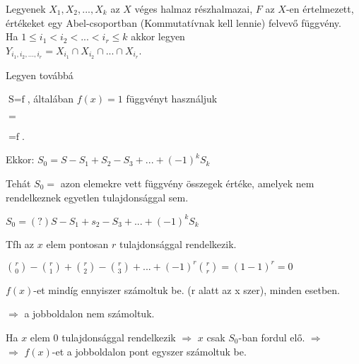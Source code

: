 \begin{frame}
  \begin{tcolorbox}[title={Tétel: Logikai szita formula}]
    Legyenek $X_1, X_2, ..., X_k$ az $X$ véges halmaz részhalmazai, $F$ az $X$-en értelmezett, értékeket egy Abel-csoportban (Kommutatívnak kell lennie) felvevő függvény.\\
    Ha $1 \leq i_1 < i_2 < ... < i_r \leq k$ akkor legyen\\
    $Y_{i_1, i_2, ..., i_r} = X_{i_1} \cap X_{i_2} \cap ... \cap X_{i_r}$.\\
    \mmedskip

    Legyen továbbá
    \mmedskip

    $\displaystyle \mathop{S = \sum_{x \in X} f(x)}$, általában $f(x) = 1$ függvényt használjuk\\
    \mmedskip

    $\displaystyle \mathop{S_r = \sum_{1 \leq i_1 < i_2 < ... < i_r \leq k} (\sum_{x \in Y_{i_1, i_2, ..., i_r}} f(x))}$ \\
    \mmedskip

    $\displaystyle \mathop{S_0 = \sum_{x \in X \setminus \bigcup^k_{i = 1} X_i} f(x)}$.\\
    \mmedskip

    Ekkor: $S_0 = S - S_1 + S_2 - S_3 + ... + (-1)^kS_k$
  \tcblower
    \\
    \mmedskip

    Tehát $S_0 =$ azon elemekre vett függvény összegek értéke, amelyek nem rendelkeznek egyetlen tulajdonsággal sem.\\
    \mmedskip

    $S_0 =(?) S - S_1 + s_2 - S_3 + ... + (-1)^k S_k$\\
    \mmedskip

    Tfh az $x$ elem pontosan $r$ tulajdonsággal rendelkezik.\\
    \mmedskip

    ${r \choose 0} - {r \choose 1} + {r \choose 2} - {r \choose 3} + ... + (-1)^r {r \choose r} = (1 - 1)^r = 0$\\
    \msmallskip
    
    $f(x)$-et mindíg ennyiszer számoltuk be. (r alatt az x szer), minden esetben.\\
    \mbigskip

    $\Rightarrow$ a jobboldalon nem számoltuk.\\
    \mbigskip

    Ha $x$ elem $0$ tulajdonsággal rendelkezik $\Rightarrow$ $x$ csak $S_0$-ban fordul elő. $\Rightarrow$\\
    $\Rightarrow$ $f(x)$-et a jobboldalon pont egyszer számoltuk be.
  \end{tcolorbox}
\end{frame}


